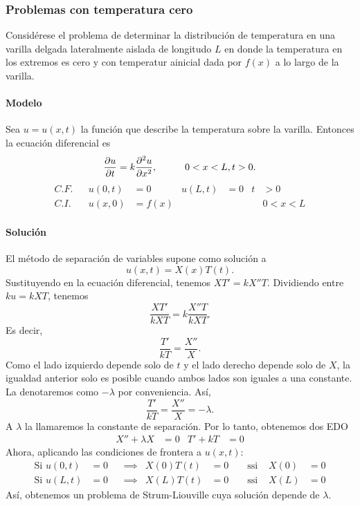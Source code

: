 \documentclass[11pt,letterpaper,draft]{report}
\theoremstyle{plain}
\theoremstyle{definition}
\theoremstyle{remark}
\newcommand\<{\langle}
\renewcommand\>{\rangle}
\begin{document}
\subsubsection{Problemas con temperatura cero}
Considérese el problema de determinar la distribución de
temperatura en una varilla delgada lateralmente aislada de
longitudo $L$ en donde la temperatura en los extremos es cero y
con temperatur ainicial dada por $f(x)$ a lo largo de la varilla.

\paragraph{Modelo}
Sea $u=u(x,t)$ la función que describe la temperatura sobre la
varilla. Entonces la ecuación diferencial es
\[
  \frac{\partial u}{\partial t}
  = k
  \frac{\partial^2 u}{\partial x^2},
  \hspace{10mm} 0<x<L, t>0
.\]
\begin{align*}
  C.F. && u(0,t) &= 0 & u(L,t) &= 0 &t&>0 \\
  C.I. && u(x,0) &= f(x) & &&& 0<x<L
\end{align*}

\paragraph{Solución}
El método de separación de variables supone como solución a
\[
  u(x,t) = X(x)T(t)
.\]
Sustituyendo en la ecuación diferencial, tenemos $XT'=kX''T$.
Dividiendo entre $ku=kXT$, tenemos
\[
  \frac{XT'}{kXT} = k \frac{X''T}{kXT}
.\]
Es decir,
\[
  \frac{T'}{kT} = \frac{X''}{X}
.\]
Como el lado izquierdo depende solo de $t$ y el lado derecho
depende solo de $X$, la igualdad anterior solo es posible cuando
ambos lados son iguales a una constante. La denotaremos como
$-\lambda$ por conveniencia.
Así,
\[
  \frac{T'}{kT} = \frac{X''}{X} = -\lambda
.\]
A $\lambda$ la llamaremos la constante de separación.
Por lo tanto, obtenemos dos EDO
\begin{align*}
  X'' + \lambda X &= 0
  &
  T' + kT &= 0
\end{align*}
Ahora, aplicando las condiciones de frontera a $u(x,t)$:
\begin{align*}
  \text{Si } u(0,t)&=0
  & &\implies &
  X(0)T(t)&=0
  & &\text{ ssi } &
  X(0)&=0 \\
  \text{Si } u(L,t)&=0
  & &\implies &
  X(L)T(t)&=0
  & &\text{ ssi } &
  X(L)&=0
\end{align*}
Así, obtenemos un problema de Strum-Liouville cuya solución
depende de $\lambda$.
\end{document}
